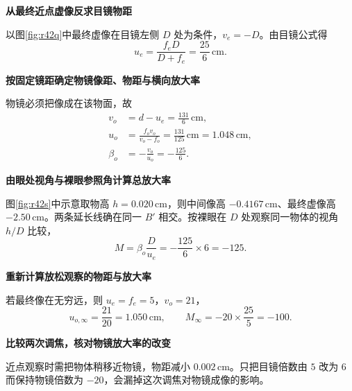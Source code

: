 \begin{solution}\textbf{从最终近点虚像反求目镜物距}\par\nobreak
以图\ref{fig:r42q}中最终虚像在目镜左侧 \(D\) 处为条件，\(v_e=-D\)。由目镜公式得
\[
 u_e=\frac{f_eD}{D+f_e}=\frac{25}{6}\,\mathrm{cm}.
\]


\par\medskip{}\noindent\textbf{按固定镜距确定物镜像距、物距与横向放大率}\par\nobreak
物镜必须把像成在该物面，故
\[
 \begin{aligned}
 v_o&=d-u_e=\frac{131}{6}\,\mathrm{cm},\\
 u_o&=\frac{f_ov_o}{v_o-f_o}
 =\boxed{\frac{131}{125}\,\mathrm{cm}=1.048\,\mathrm{cm}},\\
 \beta_o&=-\frac{v_o}{u_o}=-\frac{125}{6}.
 \end{aligned}
\]



\par\medskip{}\noindent\textbf{由眼处视角与裸眼参照角计算总放大率}\par\nobreak
图\ref{fig:r42s}中示意取物高 \(h=0.020\,\mathrm{cm}\)，则中间像高 \(-0.4167\,\mathrm{cm}\)、最终虚像高 \(-2.50\,\mathrm{cm}\)。两条延长线确在同一 \(B'\) 相交。按裸眼在 \(D\) 处观察同一物体的视角 \(h/D\) 比较，
\[
 M=\beta_o\frac{D}{u_e}
 =-\frac{125}{6}\times6=\boxed{-125}.
\]


\par\medskip{}\noindent\textbf{重新计算放松观察的物距与放大率}\par\nobreak
若最终像在无穷远，则 \(u_e=f_e=5\)，\(v_o=21\)，
\[
 \boxed{u_{o,\infty}=\frac{21}{20}=1.050\,\mathrm{cm}},\qquad
 \boxed{M_\infty=-20\times\frac{25}{5}=-100}.
\]


\par\medskip{}\noindent\textbf{比较两次调焦，核对物镜放大率的改变}\par\nobreak
近点观察时需把物体稍移近物镜，物距减小 \(0.002\,\mathrm{cm}\)。只把目镜倍数由 \(5\) 改为 \(6\) 而保持物镜倍数为 \(-20\)，会漏掉这次调焦对物镜成像的影响。
\end{solution}
